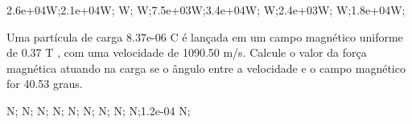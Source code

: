 \documentclass[12pt, addpoints]{exam}
\begin{document}
\begin{questions}
\begin{multicols*}{2}
\begin{oneparchoices}
\choice 2.6e+04W;\choice 2.1e+04W; W; W;\choice 7.5e+03W;\choice 3.4e+04W; W;\choice 2.4e+03W; W;\choice 1.8e+04W;\end{oneparchoices}
\question[20] Uma partícula de carga 8.37e-06 C é lançada em um campo magnético uniforme de    0.37 T , com uma velocidade de 1090.50 m/s. Calcule o valor da força magnética atuando na carga se o ângulo entre a velocidade e o campo magnético for   40.53 graus.

\begin{oneparchoices}
 N; N; N; N; N; N; N; N; N;\choice 1.2e-04 N;\end{oneparchoices}
\end{multicols*}
\end{questions}
\newpage
\end{document}
